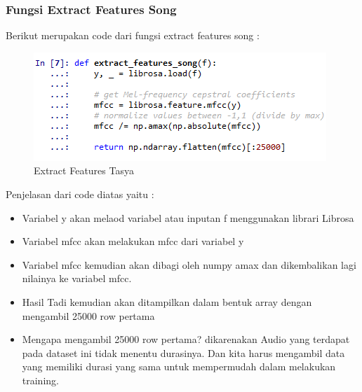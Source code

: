 \begin{enumerate}
\begin{itemize}
\subsubsection{Fungsi Extract Features Song}
Berikut merupakan code dari fungsi extract features song :\\
\begin{figure}[ht]
\centering
\includegraphics[scale=0.5]{figures/chapter6tasya9.png}
\caption{Extract Features Tasya}
\label{Praktek}
\end{figure}
Penjelasan dari code diatas yaitu :
\begin{itemize}
\item Variabel y akan melaod variabel atau inputan f menggunakan librari Librosa
\item Variabel mfcc akan melakukan mfcc dari variabel y
\item Variabel mfcc kemudian akan dibagi oleh numpy amax dan dikembalikan lagi nilainya ke variabel mfcc.
\item Hasil Tadi kemudian akan ditampilkan dalam bentuk array dengan mengambil 25000 row pertama
\item Mengapa mengambil 25000 row pertama? dikarenakan Audio yang terdapat pada dataset ini tidak menentu durasinya. Dan kita harus mengambil data yang memiliki durasi yang sama untuk mempermudah dalam melakukan training.
\end{itemize}


\end{itemize}
\end{enumerate}
